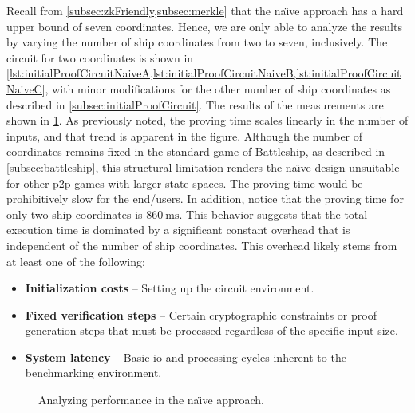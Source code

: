 Recall from \cref{subsec:zkFriendly,subsec:merkle} that the na{\"\i}ve approach has a hard upper bound of seven coordinates. Hence, we are only able to analyze the results by varying the number of ship coordinates from two to seven, inclusively. The circuit for two coordinates is shown in \cref{lst:initialProofCircuitNaiveA,lst:initialProofCircuitNaiveB,lst:initialProofCircuitNaiveC}, with minor modifications for the other number of ship coordinates as described in \cref{subsec:initialProofCircuit}. The results of the measurements are shown in \cref{fig:executionTimesNaive}. As previously noted, the proving time scales linearly in the number of inputs, and that trend is apparent in the figure. Although the number of coordinates remains fixed in the standard game of Battleship, as described in \cref{subsec:battleship}, this structural limitation renders the na{\"\i}ve design unsuitable for other \gls{p2p} games with larger state spaces. The proving time would be prohibitively slow for the end\-/users. In addition, notice that the proving time for only two ship coordinates is $\qty{860}{\milli\second}$. This behavior suggests that the total execution time is dominated by a significant constant overhead that is independent of the number of ship coordinates. This overhead likely stems from at least one of the following:
\begin{itemize}
    \item \textbf{Initialization costs} \--- Setting up the circuit environment.
    \item \textbf{Fixed verification steps} \--- Certain cryptographic constraints or proof generation steps that must be processed regardless of the specific input size.
    \item \textbf{System latency} \--- Basic \gls{io} and processing cycles inherent to the benchmarking environment.
\end{itemize}

\begin{figure}
    \centering
    \caption{Analyzing performance in the na{\"\i}ve approach.}
    \label{fig:executionTimesNaive}
\end{figure}

